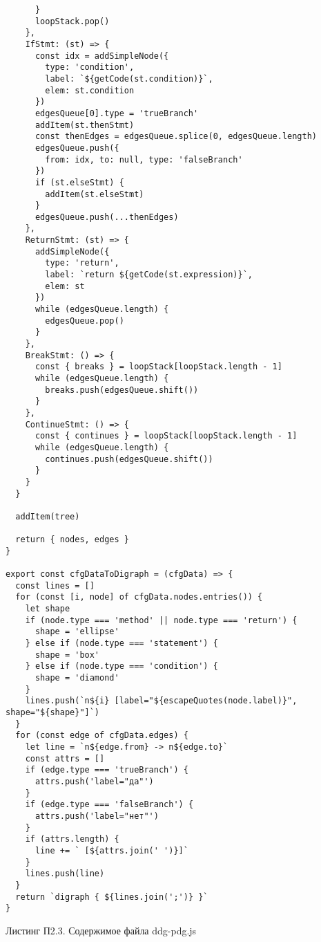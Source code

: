 \begin{lstlisting}
      }
      loopStack.pop()
    },
    IfStmt: (st) => {
      const idx = addSimpleNode({
        type: 'condition',
        label: `${getCode(st.condition)}`,
        elem: st.condition
      })
      edgesQueue[0].type = 'trueBranch'
      addItem(st.thenStmt)
      const thenEdges = edgesQueue.splice(0, edgesQueue.length)
      edgesQueue.push({
        from: idx, to: null, type: 'falseBranch'
      })
      if (st.elseStmt) {
        addItem(st.elseStmt)
      }
      edgesQueue.push(...thenEdges)
    },
    ReturnStmt: (st) => {
      addSimpleNode({
        type: 'return',
        label: `return ${getCode(st.expression)}`,
        elem: st
      })
      while (edgesQueue.length) {
        edgesQueue.pop()
      }
    },
    BreakStmt: () => {
      const { breaks } = loopStack[loopStack.length - 1]
      while (edgesQueue.length) {
        breaks.push(edgesQueue.shift())
      }
    },
    ContinueStmt: () => {
      const { continues } = loopStack[loopStack.length - 1]
      while (edgesQueue.length) {
        continues.push(edgesQueue.shift())
      }
    }
  }

  addItem(tree)

  return { nodes, edges }
}

export const cfgDataToDigraph = (cfgData) => {
  const lines = []
  for (const [i, node] of cfgData.nodes.entries()) {
    let shape
    if (node.type === 'method' || node.type === 'return') {
      shape = 'ellipse'
    } else if (node.type === 'statement') {
      shape = 'box'
    } else if (node.type === 'condition') {
      shape = 'diamond'
    }
    lines.push(`n${i} [label="${escapeQuotes(node.label)}", shape="${shape}"]`)
  }
  for (const edge of cfgData.edges) {
    let line = `n${edge.from} -> n${edge.to}`
    const attrs = []
    if (edge.type === 'trueBranch') {
      attrs.push('label="да"')
    }
    if (edge.type === 'falseBranch') {
      attrs.push('label="нет"')
    }
    if (attrs.length) {
      line += ` [${attrs.join(' ')}]`
    }
    lines.push(line)
  }
  return `digraph { ${lines.join(';')} }`
}
\end{lstlisting}

\begin{flushright}
Листинг П2.3. Содержимое файла ddg-pdg.js
\end{flushright}

